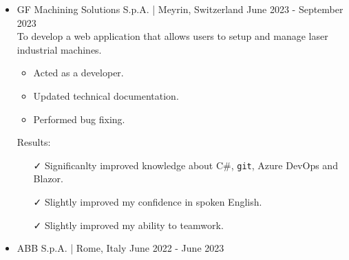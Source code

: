 \documentclass[english,10pt,a4paper]{article}
\newcommand{\SubCompanyName}[1]{\textcolor{CvIcon}{{\footnotesize \textsf{#1}}}}
\newcommand{\JobTimeRange}[1]{{\footnotesize \textcolor{CvColor!50}{\faCalendar*} \hspace{0.01cm} #1}}
\newcommand{\CvCheck}{\textcolor{CvColor}{\faCheck}}
\begin{document}
\begin{paracol}{2}
\begin{tcolorbox}[colback=white, height=\textheight, colframe=white, left=0cm]
\begin{itemize}
{\begin{itemize}
					\vspace*{0.2cm}
					\item \SubCompanyName{GF Machining Solutions S.p.A.} \textcolor{CvColor}{|} {\scriptsize Meyrin, Switzerland} \hfill \JobTimeRange{June 2023 - September 2023}\\			
					
					To develop a web application that allows users to setup and manage laser industrial machines.
					
					\begin{itemize}
						\item Acted as a developer.
						\item Updated technical documentation.
						\item Performed bug fixing.
					\end{itemize}
					
					\textcolor{CvColor}{Results:}
					\begin{itemize}
						\item[\CvCheck] Significanlty improved knowledge about C\#, \texttt{git}, Azure DevOps and Blazor.
						\item[\CvCheck] Slightly improved my confidence in spoken English.
						\item[\CvCheck] Slightly improved my ability to teamwork.
					\end{itemize}
					
					\vspace*{0.2cm}
					\item \SubCompanyName{ABB S.p.A.} \textcolor{CvColor}{|} {\scriptsize Rome, Italy} \hfill
					\JobTimeRange{June 2022 - June 2023}\\			
					

\end{itemize}}
\end{itemize}
\end{tcolorbox}
\end{paracol}
\end{document}
